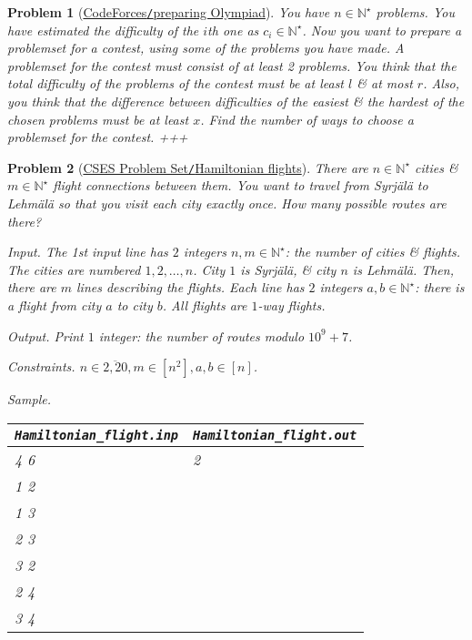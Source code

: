 \documentclass{article}
\newtheorem{problem}{Problem}
\begin{document}
\begin{problem}[\href{https://codeforces.com/contest/550/problem/B}{CodeForces{\tt/}preparing Olympiad}]
    You have $n\in\mathbb{N}^\star$ problems. You have estimated the difficulty of the $i$th one as $c_i\in\mathbb{N}^\star$. Now you want to prepare a problemset for a contest, using some of the problems you have made. A problemset for the contest must consist of at least 2 problems. You think that the total difficulty of the problems of the contest must be at least $l$ \& at most $r$. Also, you think that the difference between difficulties of the easiest \& the hardest of the chosen problems must be at least $x$. Find the number of ways to choose a problemset for the contest.
    +++
\end{problem}

\begin{problem}[\href{https://cses.fi/problemset/task/1690}{CSES Problem Set{\tt/}Hamiltonian flights}]
    There are $n\in\mathbb{N}^\star$ cities \& $m\in\mathbb{N}^\star$ flight connections between them. You want to travel from Syrjälä to Lehmälä so that you visit each city exactly once. How many possible routes are there?
    \item {\sf Input.} The 1st input line has $2$ integers $n,m\in\mathbb{N}^\star$: the number of cities \& flights. The cities are numbered $1,2,\ldots,n$. City $1$ is Syrjälä, \& city $n$ is Lehmälä. Then, there are $m$ lines describing the flights. Each line has $2$ integers $a,b\in\mathbb{N}^\star$: there is a flight from city $a$ to city $b$. All flights are $1$-way flights.
    \item {\sf Output.} Print $1$ integer: the number of routes modulo $10^9 + 7$.
    \item {\sf Constraints.} $n\in\overline{2,20},m\in[n^2],a,b\in[n]$.
    \item {\sf Sample.}
    \begin{table}[H]
        \centering
        \begin{tabular}{|l|l|}
            \hline
            \verb|Hamiltonian_flight.inp| & \verb|Hamiltonian_flight.out| \\
            \hline
            4 6 & 2\\
            1 2 & \\
            1 3 & \\
            2 3 & \\
            3 2 & \\
            2 4 & \\
            3 4 & \\
            \hline
        \end{tabular}
    \end{table}
\end{problem}
\end{document}
